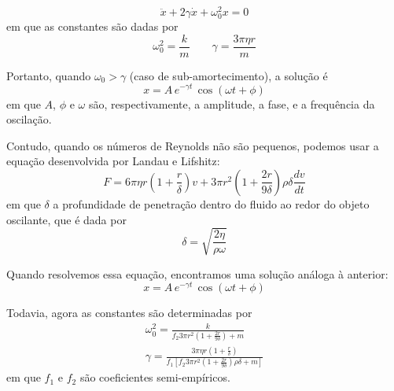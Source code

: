 \documentclass[a4paper, 12pt]{article}
\begin{document}
\begin{multicols}{2}
			\begin{equation}
				\ddot{x} + 2 \gamma \dot{x} + \omega_0^2 x = 0
			\end{equation}
			em que as constantes são dadas por
			\begin{equation}
				\omega_0^2 = \frac{k}{m} \qquad \gamma = \frac{3 \pi \eta r}{m}
			\end{equation}
			\par Portanto, quando $\omega_0 > \gamma$ (caso de sub-amortecimento), a solução é
			\begin{equation}
				x = A \, e^{- \gamma t} \, \cos (\omega t + \phi)
			\end{equation}
			em que $A$, $\phi$ e $\omega$ são, respectivamente, a amplitude, a fase, e a frequência da oscilação.
			\par Contudo, quando os números de Reynolds não são pequenos, podemos usar a equação desenvolvida por Landau e Lifshitz:
			\small \begin{equation} \label{eq:landau}
				F = 6 \pi \eta r \left(1 + \frac{r}{\delta} \right) v + 3 \pi r^2 \left( 1 + \frac{2 r}{9 \delta} \right) \rho \delta \dfrac{d v}{d t}
			\end{equation} \normalsize
			em que $\delta$ a profundidade de penetração dentro do fluido ao redor do objeto oscilante, que é dada por
			\begin{equation}
				\delta = \sqrt{\frac{2 \eta}{\rho \omega}}
			\end{equation}
			\par Quando resolvemos essa equação, encontramos uma solução análoga à anterior:
			\begin{equation}
				x = A \, e^{- \gamma t} \, \cos (\omega t + \phi)
			\end{equation}
			\par Todavia, agora as constantes são determinadas por
			\begin{equation} \label{eq:constantes} \begin{split}
				\omega_0^2 = \frac{k}{f_2 3 \pi r^2 \left(1 + \frac{2 r}{9 \delta} \right) + m} \\
				\gamma = \frac{3 \pi \eta r \left(1+ \frac{r}{\delta} \right)}{f_1 \left[ f_2 3 \pi r^2 \left(1+\frac{2 r}{9 \delta} \right) \rho \delta + m \right]}
			\end{split} \end{equation}
			em que $f_1$ e $f_2$ são coeficientes semi-empíricos.
			

\end{multicols}
\end{document}
